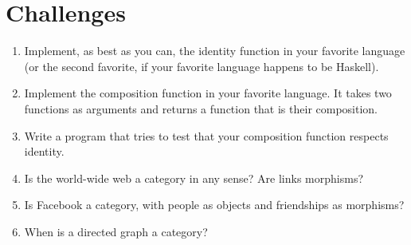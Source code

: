 \section{Challenges}\label{challenges}

\begin{enumerate}
\tightlist
\item
  Implement, as best as you can, the identity function in your favorite
  language (or the second favorite, if your favorite language happens to
  be Haskell).
\item
  Implement the composition function in your favorite language. It takes
  two functions as arguments and returns a function that is their
  composition.
\item
  Write a program that tries to test that your composition function
  respects identity.
\item
  Is the world-wide web a category in any sense? Are links morphisms?
\item
  Is Facebook a category, with people as objects and friendships as
  morphisms?
\item
  When is a directed graph a category?
\end{enumerate}